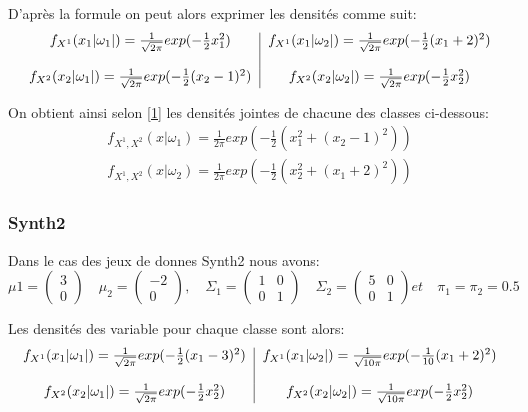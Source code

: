 \documentclass[10pt]{article}
\begin{document}
D'après la formule   on peut alors exprimer les densités comme suit:\\
\begin{equation}
\begin{tabular}{c | c}
	$f_{X^{1}}(x_{1}|\omega_{1}|) = \frac{1}{\sqrt{2\pi}}exp(-\frac{1}{2} x_{1}^{2})$ & 	$f_{X^{1}}(x_{1}|\omega_{2}|) = \frac{1}{\sqrt{2\pi}}exp(-\frac{1}{2} (x_{1}+2)^{2})$\\\\
	$f_{X^{2}}(x_{2}|\omega_{1}|) = \frac{1}{\sqrt{2\pi}}exp(-\frac{1}{2} (x_{2}-1)^{2})$ & 	$f_{X^{2}}(x_{2}|\omega_{2}|) = \frac{1}{\sqrt{2\pi}}exp(-\frac{1}{2} x_{2}^{2})$\\
\end{tabular}
\label{3}
\end{equation}

On obtient ainsi selon \eqref{1} les densités jointes de chacune des classes ci-dessous:
\begin{equation}
\begin{split}
		f_{X^{1}, X^{2}}(x|\omega_{1}) = \frac{1}{2\pi} exp(-\frac{1}{2}(x_{1}^2 + (x_{2}-1)^{2} ))  \\
f_{X^{1}, X^{2}}(x|\omega_{2}) = \frac{1}{2\pi} exp(-\frac{1}{2}(x_{2}^2 + (x_{1}+2)^{2} ))
\end{split}
\label{4}
\end{equation}


\subsubsection{Synth2}
Dans le cas des jeux de donnes Synth2 nous avons:
\[\mu{1}= \begin{pmatrix} 3 \\ 0 \end{pmatrix} \quad \mu_{2}= \begin{pmatrix} -2 \\ 0 \end{pmatrix}, \quad   \Sigma_{1} = \begin{pmatrix} 1 & 0 \\ 0 & 1	\end{pmatrix}  \quad  \Sigma_{2} = \begin{pmatrix} 5 & 0 \\ 0 & 1	\end{pmatrix}  et  \quad \pi_{1} = \pi_{2} = 0.5\]

Les densités des variable pour chaque classe sont alors:
\begin{equation}
\begin{tabular}{c | c}
$f_{X^{1}}(x_{1}|\omega_{1}|) = \frac{1}{\sqrt{2\pi}}exp(-\frac{1}{2} (x_{1} -3 )^{2})$ & 	$f_{X^{1}}(x_{1}|\omega_{2}|) = \frac{1}{\sqrt{10\pi}}exp(-\frac{1}{10} (x_{1}+2)^{2})$\\\\
$f_{X^{2}}(x_{2}|\omega_{1}|) = \frac{1}{\sqrt{2\pi}}exp(-\frac{1}{2} x_{2}^{2})$ & 	$f_{X^{2}}(x_{2}|\omega_{2}|) = \frac{1}{\sqrt{10\pi}}exp(-\frac{1}{2} x_{2}^{2})$\\
\end{tabular}
\label{5}
\end{equation}
\end{document}
